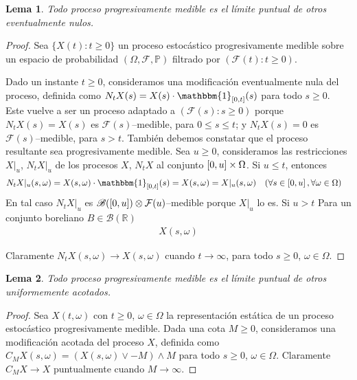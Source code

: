 \documentclass{report}
\newcommand{\leftOpenInterval}{\left]}
\newcommand{\rightOpenInterval}{\right[}
\newcommand{\leftClosedInterval}{\left[}
\newcommand{\rightClosedInterval}{\right]}
\newcommand{\interval}[3]{%
    \ifstrequal{#1}{oo}{%
      \leftOpenInterval #2, #3 \rightOpenInterval%
    }{%
      \ifstrequal{#1}{co}{%
        \leftClosedInterval #2, #3 \rightOpenInterval%
      }{%
        \ifstrequal{#1}{oc}{
          \leftOpenInterval #2, #3 \rightClosedInterval%
        }{%
          \ifstrequal{#1}{cc}{
            \leftClosedInterval #2, #3 \rightClosedInterval
          }{%
          }%
        }%
      }%
    }%
  }
\newcommand{\characteristic}{\mathbbm{1}}
\newcommand{\prob}{\mathbb{P}}
\newcommand{\events}{\mathcal{F}}
\newcommand{\borel}{\mathscr{B}}
\newcommand{\realNumbers}{\mathbb{R}}
\theoremstyle{plain}
\newtheorem{lemma}{Lema}
\theoremstyle{remark}
\theoremstyle{definition}
\begin{document}
\begin{lemma}
  Todo proceso progresivamente medible es el límite puntual de otros eventualmente nulos.
\end{lemma}
\begin{proof}
  Sea \(\{X(t) : t \geq 0\}\) un proceso estocástico progresivamente medible sobre un espacio de probabilidad \((\Omega, \events, \prob)\) filtrado por \((\events(t) : t \geq 0)\).

  Dado un instante \(t \geq 0\), consideramos una modificación eventualmente nula del proceso, definida como \(N_t X (s) = X(s) \cdot \characteristic_{[0, t]} (s)\) para todo \(s \geq 0\).
  Este vuelve a ser un proceso adaptado a \((\events(s) : s \geq 0)\) porque \(N_t X (s) = X(s)\) es \(\events(s)\)--medible, para \(0 \leq s \leq t\); y \(N_t X(s) = 0\) es \(\events(s)\)--medible, para \(s > t\).
  También debemos constatar que el proceso resultante sea progresivamente medible.
  Sea \(u \geq 0\), consideramos las restricciones \(X |_u\), \(N_t X |_u\) de los procesos \(X\), \(N_t X\) al conjunto \(\interval{cc}{0}{u} \times \Omega\).
  Si \(u \leq t\), entonces 
  \begin{align}
    &N_t X |_u (s, \omega) 
    = 
    X(s, \omega) \cdot \characteristic_{\interval{cc}{0}{t}}(s) 
    = 
    X(s, \omega)
    =
    X |_u (s, \omega)
    && (\forall s \in \interval{cc}{0}{u}, \forall \omega \in \Omega)
  \end{align}
  En tal caso \(N_t X |_u\) es \(\borel(\interval{cc}{0}{u}) \otimes \events(u)\)--medible porque \(X |_u\) lo es.
  Si \(u > t\)
  Para un conjunto boreliano \(B \in \borel(\realNumbers)\)
  \begin{align}
    X(s, \omega)
  \end{align}
  

  Claramente \(N_t X (s, \omega) \rightarrow X(s, \omega)\) cuando \(t \rightarrow \infty\), para todo \(s \geq 0\), \(\omega \in \Omega\).
\end{proof}

\begin{lemma}
  Todo proceso progresivamente medible es el límite puntual de otros uniformemente acotados.
\end{lemma}
\begin{proof}
  Sea \(X(t, \omega)\) con \(t \geq 0\), \(\omega \in \Omega\) la representación estática de un proceso estocástico progresivamente medible.
  Dada una cota \(M \geq 0\), consideramos una modificación acotada del proceso \(X\), definida como \(C_M X (s, \omega) = (X(s, \omega) \vee - M) \wedge M\) para todo \(s \geq 0\), \(\omega \in \Omega\).
  Claramente \(C_M X \rightarrow X\) puntualmente cuando \(M \rightarrow \infty\).
\end{proof}
\end{document}
